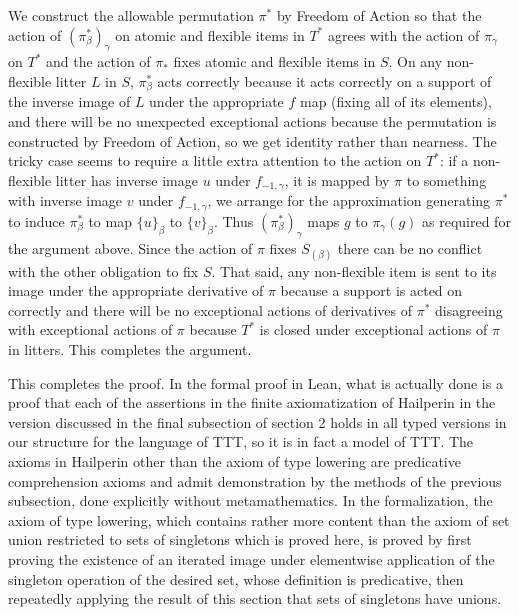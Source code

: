\documentclass[112pt]{article}
\begin{document}
We construct the allowable permutation $\pi^*$ by Freedom of Action so that the action of $(\pi^*_\beta)_\gamma$ on atomic and flexible items in $T^*$ agrees with the action of $\pi_\gamma$ on $T^*$
and the action of $\pi_*$ fixes atomic and flexible items in $S$.  On any non-flexible litter $L$ in $S$, $\pi^*_\beta$ acts correctly because it acts correctly on a support of the inverse image of $L$ under the appropriate $f$ map (fixing all of its elements), and there will be no unexpected exceptional actions because the permutation is constructed by Freedom of Action, so we get identity rather than nearness.
The tricky case seems to require a little extra attention to the action on $T^*$:  if a non-flexible litter has inverse image $u$ under $f_{-1,\gamma}$, it is mapped by $\pi$ to something with inverse image $v$ under $f_{-1,\gamma}$, we arrange for the
approximation generating $\pi^*$ to induce
$\pi^*_\beta$ to map $\{u\}_\beta$ to $\{v\}_\beta$.  Thus  $(\pi^*_\beta)_\gamma$ maps $g$ to $\pi_\gamma(g)$ as required for the argument above.  Since the action of $\pi$ fixes $S_{(\beta)}$ there can be no conflict with the other obligation to fix $S$.  That said, any non-flexible item is sent to its image under the appropriate derivative of $\pi$ because
a support is acted on correctly and there will be no exceptional actions of derivatives of $\pi^*$ disagreeing with exceptional actions of $\pi$ because $T^*$ is closed under exceptional actions of $\pi$ in litters.  This completes the argument.

This completes the proof.  In the formal proof in Lean, what is actually done is a proof that each of the assertions in the finite axiomatization of Hailperin in the version discussed in the final subsection of section 2  holds in all typed versions in our structure for the language of TTT, so it is in fact a model of TTT.  The axioms in Hailperin other than the axiom of type lowering are predicative comprehension axioms and
admit demonstration by the methods of the previous subsection, done explicitly without metamathematics.  In the formalization, the axiom of type lowering, which contains rather more content than the axiom of set union restricted to sets of singletons which is proved here, is proved by first proving the existence of an iterated image under elementwise application of the singleton operation of the desired set, whose definition is predicative, then repeatedly applying the result of this section that sets of singletons have unions.
\end{document}
